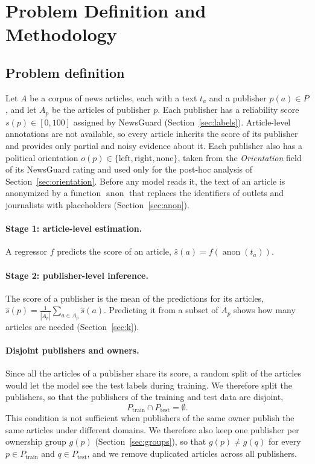 \documentclass[11pt,a4paper]{article}
\newcommand{\anon}{\operatorname{anon}}
\begin{document}
\section{Problem Definition and Methodology}\label{sec:problem}

\subsection{Problem definition}\label{sec:definition}
Let $A$ be a corpus of news articles, each with a text $t_a$ and a publisher $p(a) \in P$, and let $A_p$ be the articles
of publisher $p$. Each publisher has a reliability score $s(p) \in [0, 100]$ assigned by NewsGuard
(Section~\ref{sec:labels}). Article-level annotations are not available, so every article inherits the score of its
publisher and provides only partial and noisy evidence about it. Each publisher also has a political orientation
$o(p) \in \{\text{left}, \text{right}, \text{none}\}$, taken from the \emph{Orientation} field of its NewsGuard rating and
used only for the post-hoc analysis of Section~\ref{sec:orientation}. Before any model reads it, the text of an article
is anonymized by a function $\anon$ that replaces the identifiers of outlets and journalists with placeholders
(Section~\ref{sec:anon}).

\paragraph{Stage 1: article-level estimation.} A regressor $f$ predicts the score of an article,
$\hat{s}(a) = f(\anon(t_a))$.

\paragraph{Stage 2: publisher-level inference.} The score of a publisher is the mean of the predictions for its
articles, $\hat{s}(p) = \frac{1}{|A_p|} \sum_{a \in A_p} \hat{s}(a)$. Predicting it from a subset of $A_p$ shows how
many articles are needed (Section~\ref{sec:k}).

\paragraph{Disjoint publishers and owners.} Since all the articles of a publisher share its score, a random split of the
articles would let the model see the test labels during training. We therefore split the publishers, so that the
publishers of the training and test data are disjoint,
\begin{equation}\label{eq:disjoint}
P_{\text{train}} \cap P_{\text{test}} = \emptyset .
\end{equation}
This condition is not sufficient when publishers of the same owner publish the same articles under different domains.
We therefore also keep one publisher per ownership group $g(p)$ (Section~\ref{sec:groups}), so that $g(p) \neq g(q)$ for
every $p \in P_{\text{train}}$ and $q \in P_{\text{test}}$, and we remove duplicated articles across all publishers.
\end{document}
